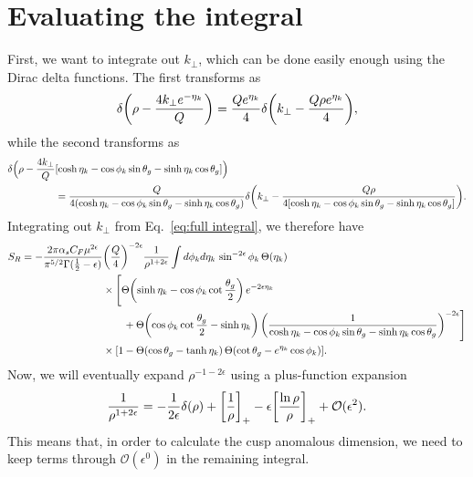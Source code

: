 \documentclass[11pt,twoside,reqno]{amsart}
\theoremstyle{plain}
\theoremstyle{remark}
\theoremstyle{definition}
\theoremstyle{remark}
\theoremstyle{definition}
\theoremstyle{definition}
\newcommand{\cO}{\mathcal{O}}
\begin{document}
\section{Evaluating the integral}
	First, we want to integrate out $k_\perp$, which can be done easily enough using the Dirac delta functions. The first transforms as
	\begin{equation}
		\delta\qty(\rho - \frac{4k_\perp e^{-\eta_k}}{Q}) = \frac{Q e^{\eta_k}}{4} \delta\qty(k_\perp - \frac{Q \rho e^{\eta_k}}{4}),
	\end{equation}
	while the second transforms as
	\begin{equation}
	\begin{aligned}
		\delta\Big(\rho - \frac{4 k_\perp}{Q}&\qty[\cosh\eta_k - \cos\phi_k\sin\theta_g - \sinh\eta_k\cos\theta_g]\Big) \\
		&= \frac{Q}{4\qty(\cosh\eta_k - \cos\phi_k\sin\theta_g - \sinh\eta_k\cos\theta_g)} \delta\qty(k_\perp - \frac{Q \rho}{4\qty[\cosh\eta_k - \cos\phi_k\sin\theta_g - \sinh\eta_k\cos\theta_g]}).
	\end{aligned}
	\end{equation}
	Integrating out $k_\perp$ from Eq.~\ref{eq:full integral}, we therefore have
	\begin{equation}\label{eq:full integral without kperp}
	\begin{aligned}
		S_R = -\frac{2\pi\alpha_s C_F\mu^{2\epsilon}}{\pi^{5/2} \Gamma(\frac{1}{2} - \epsilon)} &\qty(\frac{Q}{4})^{-2\epsilon} \frac{1}{\rho^{1+2\epsilon}} \int d\phi_k d\eta_k\, \sin^{-2\epsilon}\phi_k \, \Theta(\eta_k) \\
		&\times \Bigg[ \Theta\qty(\sinh\eta_k - \cos\phi_k\cot\frac{\theta_g}{2})\,e^{-2\epsilon\eta_k} \\
			&\qquad+ \Theta\qty(\cos\phi_k\cot\frac{\theta_g}{2} - \sinh\eta_k)\, \qty(\frac{1}{\cosh\eta_k - \cos\phi_k\sin\theta_g - \sinh\eta_k\cos\theta_g})^{-2\epsilon}\Bigg] \\
			&\times \qty[1 - \Theta(\cos\theta_g - \tanh\eta_k)\,\Theta\qty(\cot\theta_g - e^{\eta_k}\cos\phi_k)].
	\end{aligned}
	\end{equation}
	Now, we will eventually expand $\rho^{-1-2\epsilon}$ using a plus-function expansion \cite{lazopoulos_qcd_2007}
	\begin{equation}
		\frac{1}{\rho^{1+2\epsilon}} = -\frac{1}{2\epsilon}\delta(\rho) + \qty[\frac{1}{\rho}]_+ - \epsilon \qty[\frac{\ln \rho}{\rho}]_+ + \cO(\epsilon^2).
	\end{equation}
	This means that, in order to calculate the cusp anomalous dimension, we need to keep terms through $\cO(\epsilon^0)$ in the remaining integral.
\end{document}
